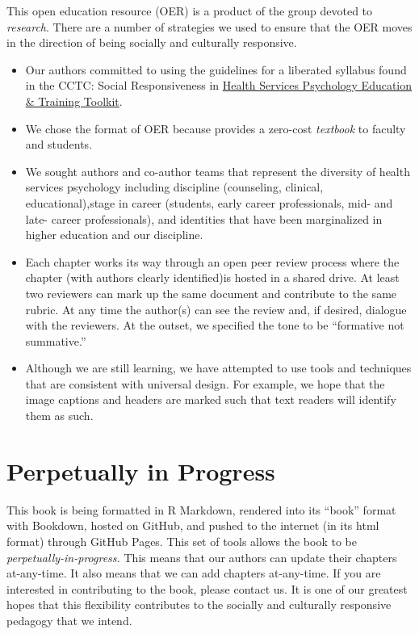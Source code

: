\documentclass[
  11pt,
]{book}
\providecommand{\tightlist}{%
  \setlength{\itemsep}{0pt}\setlength{\parskip}{0pt}}
\begin{document}
This open education resource (OER) is a product of the group devoted to \emph{research}. There are a number of strategies we used to ensure that the OER moves in the direction of being socially and culturally responsive.

\begin{itemize}
\tightlist
\item
  Our authors committed to using the guidelines for a liberated syllabus found in the CCTC: Social Responsiveness in \href{https://pr4tb8rrj317wdwt3xlafg2p-wpengine.netdna-ssl.com/wp-content/uploads/2021/05/CCTC_Socially-Responsive-HSP-Ed-Training_v7.pdf}{Health Services Psychology Education \& Training Toolkit}.
\item
  We chose the format of OER because provides a zero-cost \emph{textbook} to faculty and students.
\item
  We sought authors and co-author teams that represent the diversity of health services psychology including discipline (counseling, clinical, educational),stage in career (students, early career professionals, mid- and late- career professionals), and identities that have been marginalized in higher education and our discipline.
\item
  Each chapter works its way through an open peer review process where the chapter (with authors clearly identified)is hosted in a shared drive. At least two reviewers can mark up the same document and contribute to the same rubric. At any time the author(s) can see the review and, if desired, dialogue with the reviewers. At the outset, we specified the tone to be ``formative not summative.''
\item
  Although we are still learning, we have attempted to use tools and techniques that are consistent with universal design. For example, we hope that the image captions and headers are marked such that text readers will identify them as such.
\end{itemize}

\section*{Perpetually in Progress}\label{perpetually-in-progress}


This book is being formatted in R Markdown, rendered into its ``book'' format with Bookdown, hosted on GitHub, and pushed to the internet (in its html format) through GitHub Pages. This set of tools allows the book to be \emph{perpetually-in-progress.} This means that our authors can update their chapters at-any-time. It also means that we can add chapters at-any-time. If you are interested in contributing to the book, please contact us. It is one of our greatest hopes that this flexibility contributes to the socially and culturally responsive pedagogy that we intend.
\end{document}
